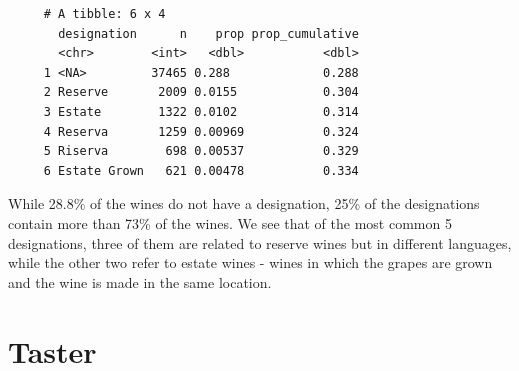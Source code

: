 \documentclass[12pt,twoside]{amherstthesis}
\begin{document}
\begin{verbatim}
     # A tibble: 6 x 4
       designation      n    prop prop_cumulative
       <chr>        <int>   <dbl>           <dbl>
     1 <NA>         37465 0.288             0.288
     2 Reserve       2009 0.0155            0.304
     3 Estate        1322 0.0102            0.314
     4 Reserva       1259 0.00969           0.324
     5 Riserva        698 0.00537           0.329
     6 Estate Grown   621 0.00478           0.334
\end{verbatim}
While 28.8\% of the wines do not have a designation, 25\% of the
designations contain more than 73\% of the wines. We see that of the
most common 5 designations, three of them are related to reserve wines
but in different languages, while the other two refer to estate wines -
wines in which the grapes are grown and the wine is made in the same
location.

\section{Taster}\label{taster}
\end{document}
